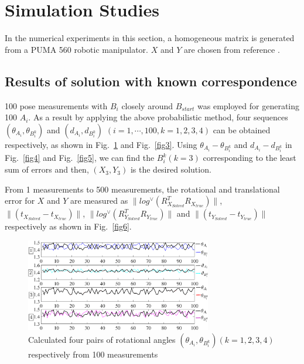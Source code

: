 \documentclass[conference,letterpaper]{IEEEtran}
\begin{document}
\section{Simulation Studies}
\label{sect4}

In the numerical experiments in this section, a homogeneous matrix   is generated from a PUMA 560 robotic manipulator. $X$ and $Y$ are chosen from reference .

\subsection{Results of solution with known correspondence}

100 pose measurements with $B_{i}$ closely around $B_{start}$ was employed for generating 100 $A_{i}$. As a result by applying the above probabilistic method, four sequences $(\theta_{A_{i}},\theta_{B_{i}^{k}})$ and $(d_{A_{i}},d_{B_{i}^{k}})$ $ (i=1,\cdots, 100, k=1,2,3,4)$ can be obtained respectively, as shown in Fig.~\ref{fig2} and Fig.~\ref{fig3}. Using $\theta_{A_{i}} - \theta_{B_{i}^{k}}$ and $d_{A_{i}} - d_{B_{i}^{k}}$  in Fig.~\ref{fig4} and Fig.~\ref{fig5}, we can find the ${B_{i}^{k}}(k=3)$  corresponding to the least sum of errors and then, $(X_3,Y_3)$ is the desired solution.

From 1 measurements to 500 measurements, the rotational and translational error for $X$ and $Y$ are measured as  $\parallel log^{\vee} (R_{X_{Solved}}^{T}R_{X_{true}})\parallel$, $\parallel (t_{X_{Solved}}-t_{X_{true}})\parallel$, $\parallel log^{\vee} (R_{Y_{Solved}}^{T}R_{Y_{true}})\parallel$ and $\parallel (t_{Y_{Solved}}-t_{Y_{true}})\parallel$ respectively as shown in Fig.~\ref{fig6}.

\begin{center}
\begin{figure}[htbp]
\centering
\includegraphics[width=3.2in]{fig2.eps}
\caption{
Calculated four pairs of rotational angles $(\theta_{A_{i}},\theta_{B_{i}^{k}}) (k=1,2,3,4)$  respectively from 100 measurements
}
\label{fig2}
\end{figure}
\end{center}
\end{document}
